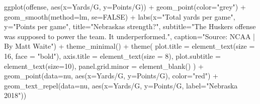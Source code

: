 \documentclass[
]{book}
\newenvironment{Shaded}{\begin{snugshade}}{\end{snugshade}}
\newcommand{\AttributeTok}[1]{\textcolor[rgb]{0.77,0.63,0.00}{#1}}
\newcommand{\ConstantTok}[1]{\textcolor[rgb]{0.00,0.00,0.00}{#1}}
\newcommand{\DecValTok}[1]{\textcolor[rgb]{0.00,0.00,0.81}{#1}}
\newcommand{\FunctionTok}[1]{\textcolor[rgb]{0.00,0.00,0.00}{#1}}
\newcommand{\NormalTok}[1]{#1}
\newcommand{\SpecialCharTok}[1]{\textcolor[rgb]{0.00,0.00,0.00}{#1}}
\newcommand{\StringTok}[1]{\textcolor[rgb]{0.31,0.60,0.02}{#1}}
\begin{document}
\begin{Shaded}
\begin{Highlighting}[]
\FunctionTok{ggplot}\NormalTok{(offense, }\FunctionTok{aes}\NormalTok{(}\AttributeTok{x=}\StringTok{\textasciigrave{}}\AttributeTok{Yards/G}\StringTok{\textasciigrave{}}\NormalTok{, }\AttributeTok{y=}\StringTok{\textasciigrave{}}\AttributeTok{Points/G}\StringTok{\textasciigrave{}}\NormalTok{)) }\SpecialCharTok{+} 
  \FunctionTok{geom\_point}\NormalTok{(}\AttributeTok{color=}\StringTok{"grey"}\NormalTok{) }\SpecialCharTok{+} \FunctionTok{geom\_smooth}\NormalTok{(}\AttributeTok{method=}\NormalTok{lm, }\AttributeTok{se=}\ConstantTok{FALSE}\NormalTok{) }\SpecialCharTok{+} 
  \FunctionTok{labs}\NormalTok{(}\AttributeTok{x=}\StringTok{"Total yards per game"}\NormalTok{, }\AttributeTok{y=}\StringTok{"Points per game"}\NormalTok{, }\AttributeTok{title=}\StringTok{"Nebraska\textquotesingle{}s strength?"}\NormalTok{, }\AttributeTok{subtitle=}\StringTok{"The Husker\textquotesingle{}s offense was supposed to power the team. It underperformed."}\NormalTok{, }\AttributeTok{caption=}\StringTok{"Source: NCAA | By Matt Waite"}\NormalTok{) }\SpecialCharTok{+} 
  \FunctionTok{theme\_minimal}\NormalTok{() }\SpecialCharTok{+} 
  \FunctionTok{theme}\NormalTok{(}
    \AttributeTok{plot.title =} \FunctionTok{element\_text}\NormalTok{(}\AttributeTok{size =} \DecValTok{16}\NormalTok{, }\AttributeTok{face =} \StringTok{"bold"}\NormalTok{),}
    \AttributeTok{axis.title =} \FunctionTok{element\_text}\NormalTok{(}\AttributeTok{size =} \DecValTok{8}\NormalTok{), }
    \AttributeTok{plot.subtitle =} \FunctionTok{element\_text}\NormalTok{(}\AttributeTok{size=}\DecValTok{10}\NormalTok{), }
    \AttributeTok{panel.grid.minor =} \FunctionTok{element\_blank}\NormalTok{()}
\NormalTok{    ) }\SpecialCharTok{+}
  \FunctionTok{geom\_point}\NormalTok{(}\AttributeTok{data=}\NormalTok{nu, }\FunctionTok{aes}\NormalTok{(}\AttributeTok{x=}\StringTok{\textasciigrave{}}\AttributeTok{Yards/G}\StringTok{\textasciigrave{}}\NormalTok{, }\AttributeTok{y=}\StringTok{\textasciigrave{}}\AttributeTok{Points/G}\StringTok{\textasciigrave{}}\NormalTok{), }\AttributeTok{color=}\StringTok{"red"}\NormalTok{) }\SpecialCharTok{+} 
  \FunctionTok{geom\_text\_repel}\NormalTok{(}\AttributeTok{data=}\NormalTok{nu, }\FunctionTok{aes}\NormalTok{(}\AttributeTok{x=}\StringTok{\textasciigrave{}}\AttributeTok{Yards/G}\StringTok{\textasciigrave{}}\NormalTok{, }\AttributeTok{y=}\StringTok{\textasciigrave{}}\AttributeTok{Points/G}\StringTok{\textasciigrave{}}\NormalTok{, }\AttributeTok{label=}\StringTok{"Nebraska 2018"}\NormalTok{))}
\end{Highlighting}
\end{Shaded}
\end{document}
